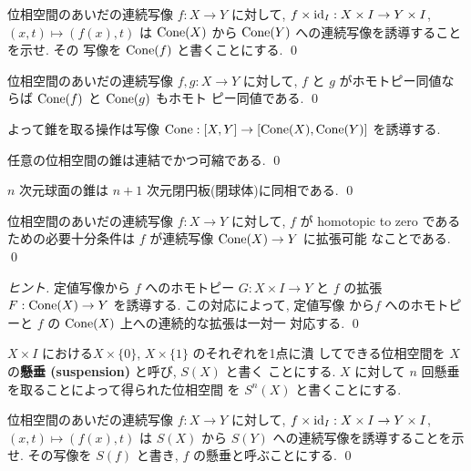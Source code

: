 \documentclass[12pt,twoside]{jarticle}
\begin{document}
\begin{question}
  位相空間のあいだの連続写像 $f:X\to Y$ に対して, %
  $f\times \mathop{\mathrm{id}}\nolimits_I : X\times I \to Y\times I$, $(x,t)\mapsto(f(x),t)$ %
  は $\mathop{\mathrm{Cone}}(X)$ から $\mathop{\mathrm{Cone}}(Y)$ への連続写像を誘導することを示せ. その
  写像を $\mathop{\mathrm{Cone}}(f)$ と書くことにする. 
  \qed
\end{question}

\begin{question}
  位相空間のあいだの連続写像 $f,g:X\to Y$ に対して, %
  $f$ と $g$ がホモトピー同値ならば $\mathop{\mathrm{Cone}}(f)$ と $\mathop{\mathrm{Cone}}(g)$ もホモト
  ピー同値である. \qed
\end{question}

\noindent よって錐を取る操作は写像 %
$\mathop{\mathrm{Cone}}:[X,Y]\to[\mathop{\mathrm{Cone}}(X),\mathop{\mathrm{Cone}}(Y)]$ を誘導する. %

\begin{question}\qstar{*}
  任意の位相空間の錐は連結でかつ可縮である. \qed
\end{question}

\begin{question}\qstar{*}
  $n$ 次元球面の錐は $n+1$ 次元閉円板(閉球体)に同相である. \qed
\end{question}

\begin{question}\label{q:cone-nullhomotopic}\qstar{*}
  位相空間のあいだの連続写像 $f:X\to Y$ に対して, $f$ が homotopic to zero
  であるための必要十分条件は $f$ が連続写像 $\mathop{\mathrm{Cone}}(X)\to Y$ に拡張可能
  なことである. \qed
\end{question}

\begin{proof}[ヒント]
定値写像から $f$ へのホモトピー $G:X\times I\to Y$ 
と $f$ の拡張 $F:\mathop{\mathrm{Cone}}(X)\to Y$ を誘導する. この対応によって, 定値写像
から$f$ へのホモトピーと $f$ の $\mathop{\mathrm{Cone}}(X)$ 上への連続的な拡張は一対一
対応する.
\qed 
\end{proof}

$X\times I$ における$X\times\{0\}$, $X\times\{1\}$ のそれぞれを1点に潰
してできる位相空間を $X$ の{\bf 懸垂 (suspension)} と呼び, $S(X)$ と書く
ことにする. $X$ に対して $n$ 回懸垂を取ることによって得られた位相空間
を $S^n(X)$ と書くことにする.

\begin{question}
  位相空間のあいだの連続写像 $f:X\to Y$ に対して, %
  $f\times \mathop{\mathrm{id}}\nolimits_I : X\times I \to Y\times I$, $(x,t)\mapsto(f(x),t)$ は %
  $S(X)$ から $S(Y)$ への連続写像を誘導することを示せ. その写像を %
  $S(f)$ と書き, $f$ の懸垂と呼ぶことにする. 
  \qed
\end{question}
\end{document}
